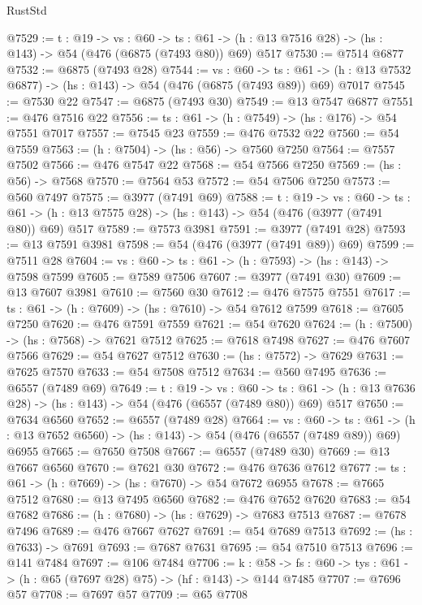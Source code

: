 \begin{lexlean}{RustStd}
\begin{coremodule}
@7529 := {t : @19} ->
  {vs : @60} ->
  {ts : @61} -> (h : @13 @7516 @28) -> (hs : @143) -> @54 (@476 (@6875 (@7493 @80)) @69) @517
@7530 := @7514 @6877
@7532 := @6875 (@7493 @28)
@7544 := {vs : @60} ->
  {ts : @61} -> (h : @13 @7532 @6877) -> (hs : @143) -> @54 (@476 (@6875 (@7493 @89)) @69) @7017
@7545 := @7530 @22
@7547 := @6875 (@7493 @30)
@7549 := @13 @7547 @6877
@7551 := @476 @7516 @22
@7556 := {ts : @61} -> (h : @7549) -> (hs : @176) -> @54 @7551 @7017
@7557 := @7545 @23
@7559 := @476 @7532 @22
@7560 := @54 @7559
@7563 := (h : @7504) -> (hs : @56) -> @7560 @7250
@7564 := @7557 @7502
@7566 := @476 @7547 @22
@7568 := @54 @7566 @7250
@7569 := (hs : @56) -> @7568
@7570 := @7564 @53
@7572 := @54 @7506 @7250
@7573 := @560 @7497
@7575 := @3977 (@7491 @69)
@7588 := {t : @19} ->
  {vs : @60} ->
  {ts : @61} -> (h : @13 @7575 @28) -> (hs : @143) -> @54 (@476 (@3977 (@7491 @80)) @69) @517
@7589 := @7573 @3981
@7591 := @3977 (@7491 @28)
@7593 := @13 @7591 @3981
@7598 := @54 (@476 (@3977 (@7491 @89)) @69)
@7599 := @7511 @28
@7604 := {vs : @60} -> {ts : @61} -> (h : @7593) -> (hs : @143) -> @7598 @7599
@7605 := @7589 @7506
@7607 := @3977 (@7491 @30)
@7609 := @13 @7607 @3981
@7610 := @7560 @30
@7612 := @476 @7575 @7551
@7617 := {ts : @61} -> (h : @7609) -> (hs : @7610) -> @54 @7612 @7599
@7618 := @7605 @7250
@7620 := @476 @7591 @7559
@7621 := @54 @7620
@7624 := (h : @7500) -> (hs : @7568) -> @7621 @7512
@7625 := @7618 @7498
@7627 := @476 @7607 @7566
@7629 := @54 @7627 @7512
@7630 := (hs : @7572) -> @7629
@7631 := @7625 @7570
@7633 := @54 @7508 @7512
@7634 := @560 @7495
@7636 := @6557 (@7489 @69)
@7649 := {t : @19} ->
  {vs : @60} ->
  {ts : @61} -> (h : @13 @7636 @28) -> (hs : @143) -> @54 (@476 (@6557 (@7489 @80)) @69) @517
@7650 := @7634 @6560
@7652 := @6557 (@7489 @28)
@7664 := {vs : @60} ->
  {ts : @61} -> (h : @13 @7652 @6560) -> (hs : @143) -> @54 (@476 (@6557 (@7489 @89)) @69) @6955
@7665 := @7650 @7508
@7667 := @6557 (@7489 @30)
@7669 := @13 @7667 @6560
@7670 := @7621 @30
@7672 := @476 @7636 @7612
@7677 := {ts : @61} -> (h : @7669) -> (hs : @7670) -> @54 @7672 @6955
@7678 := @7665 @7512
@7680 := @13 @7495 @6560
@7682 := @476 @7652 @7620
@7683 := @54 @7682
@7686 := (h : @7680) -> (hs : @7629) -> @7683 @7513
@7687 := @7678 @7496
@7689 := @476 @7667 @7627
@7691 := @54 @7689 @7513
@7692 := (hs : @7633) -> @7691
@7693 := @7687 @7631
@7695 := @54 @7510 @7513
@7696 := @141 @7484
@7697 := @106 @7484
@7706 := {k : @58} ->
  {fs : @60} -> {tys : @61} -> (h : @65 (@7697 @28) @75) -> (hf : @143) -> @144 @7485
@7707 := @7696 @57
@7708 := @7697 @57
@7709 := @65 @7708

\end{coremodule}
\end{lexlean}
